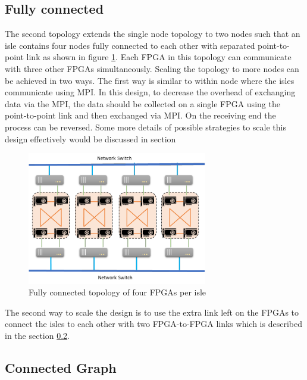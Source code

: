 \subsection{Fully connected}
\label{sec:fully_connect}

The second topology extends the single node topology to two nodes such that
an isle contains four nodes fully connected to each other with separated
point-to-point link as shown in figure \ref{fig:fully_connect}.
Each FPGA in this topology can communicate with three
other FPGAs simultaneously. Scaling the topology to more nodes can be achieved
in two ways. The first way is similar to within node where the isles communicate
using MPI. In this design, to decrease the overhead of exchanging data via the
MPI, the data should be collected on a single FPGA using the point-to-point
link and then exchanged via MPI. On the receiving end the process can be
reversed. Some more details of possible strategies to scale this design
effectively would be discussed in section 

\begin{figure}[h]%
    \centering
    \includegraphics[width=0.7\textwidth]{images/full_connect}
    \caption{Fully connected topology of four FPGAs per isle}
    \label{fig:fully_connect}
\end{figure}

The second way to scale the design is to use the extra link left on the
FPGAs to connect the isles to each other with two FPGA-to-FPGA links which is
described in the section \ref{sec:connected_graph}.

\subsection{Connected Graph}
\label{sec:connected_graph}

